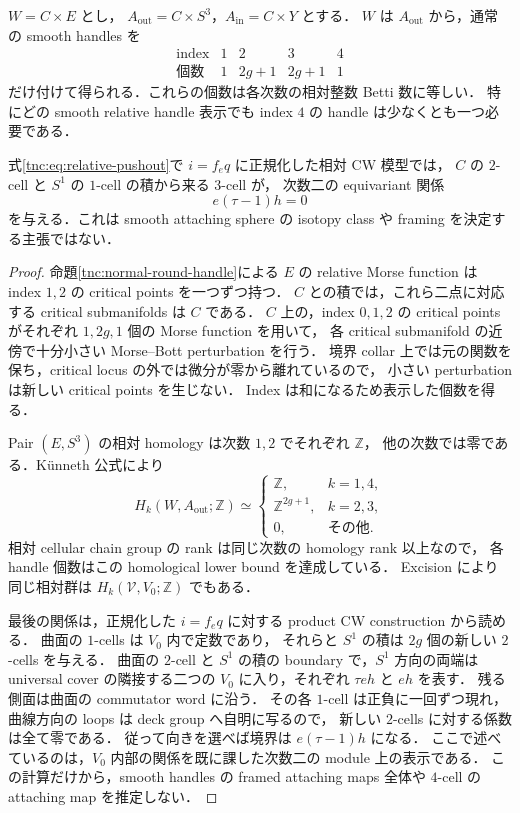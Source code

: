 \begin{proposition}
\label{tnc:product-relative-handles}
$W=C\times E$ とし，
$A_{\mathrm{out}}=C\times S^3$，$A_{\mathrm{in}}=C\times Y$ とする．
$W$ は $A_{\mathrm{out}}$ から，通常の smooth handles を
\[
\begin{array}{c|rrrr}
 \text{index}&1&2&3&4\\ \hline
 \text{個数}&1&2g+1&2g+1&1
\end{array}
\]
だけ付けて得られる．これらの個数は各次数の相対整数 Betti 数に等しい．
特にどの smooth relative handle 表示でも index $4$ の handle は少なくとも一つ必要である．

式\eqref{tnc:eq:relative-pushout}で $i=f_e q$ に正規化した相対 CW 模型では，
$C$ の $2$-cell と $S^1$ の $1$-cell の積から来る $3$-cell が，
次数二の equivariant 関係
\[
 e(\tau-1)h=0
\]
を与える．これは smooth attaching sphere の isotopy class や framing を決定する主張ではない．
\end{proposition}

\begin{proof}
命題\ref{tnc:normal-round-handle}による $E$ の relative Morse function は
index $1,2$ の critical points を一つずつ持つ．
$C$ との積では，これら二点に対応する critical submanifolds は $C$ である．
$C$ 上の，index $0,1,2$ の critical points がそれぞれ $1,2g,1$ 個の Morse function を用いて，
各 critical submanifold の近傍で十分小さい Morse--Bott perturbation を行う．
境界 collar 上では元の関数を保ち，critical locus の外では微分が零から離れているので，
小さい perturbation は新しい critical points を生じない．
Index は和になるため表示した個数を得る．

Pair $(E,S^3)$ の相対 homology は次数 $1,2$ でそれぞれ $\mathbb Z$，
他の次数では零である．K\"unneth 公式により
\begin{equation}\label{tnc:eq:relative-homology-out}
 H_k(W,A_{\mathrm{out}};\mathbb Z)\simeq
 \begin{cases}
  \mathbb Z,&k=1,4,\\
  \mathbb Z^{2g+1},&k=2,3,\\
  0,&\text{その他}.
 \end{cases}
\end{equation}
相対 cellular chain group の rank は同じ次数の homology rank 以上なので，
各 handle 個数はこの homological lower bound を達成している．
Excision により同じ相対群は $H_k(\mathcal V,V_0;\mathbb Z)$ でもある．

最後の関係は，正規化した $i=f_eq$ に対する product CW construction から読める．
曲面の $1$-cells は $V_0$ 内で定数であり，
それらと $S^1$ の積は $2g$ 個の新しい $2$-cells を与える．
曲面の $2$-cell と $S^1$ の積の boundary で，$S^1$ 方向の両端は
universal cover の隣接する二つの $V_0$ に入り，それぞれ $\tau e h$ と $e h$ を表す．
残る側面は曲面の commutator word に沿う．
その各 $1$-cell は正負に一回ずつ現れ，曲線方向の loops は deck group へ自明に写るので，
新しい $2$-cells に対する係数は全て零である．
従って向きを選べば境界は $e(\tau-1)h$ になる．
ここで述べているのは，$V_0$ 内部の関係を既に課した次数二の module 上の表示である．
この計算だけから，smooth handles の framed attaching maps 全体や
$4$-cell の attaching map を推定しない．
\end{proof}

